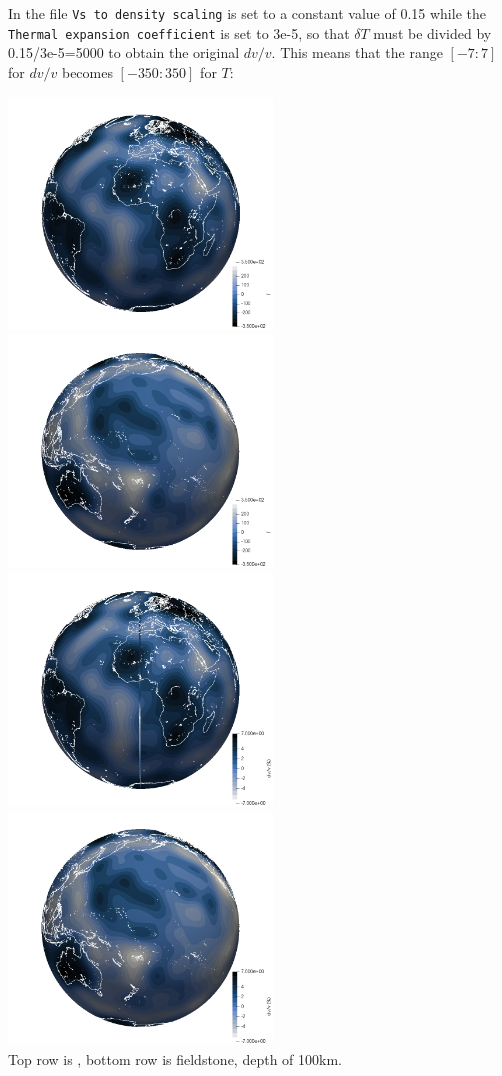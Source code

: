 In the file \texttt{Vs to density scaling} is set to a constant value of 0.15 while 
the \texttt{Thermal expansion coefficient} is set to 3e-5, so that $\delta T$ must be 
divided by 0.15/3e-5=5000 to obtain the original $dv/v$. This means that the 
range $[-7:7]$ for $dv/v$ becomes $[-350:350]$ for $T$:


\begin{center}
\includegraphics[width=7cm]{python_codes/fieldstone_85/aspect/aspect1}
\includegraphics[width=7cm]{python_codes/fieldstone_85/aspect/aspect2}\\
\includegraphics[width=7cm]{python_codes/fieldstone_85/aspect/fieldstone1}
\includegraphics[width=7cm]{python_codes/fieldstone_85/aspect/fieldstone2}\\
{\captionfont Top row is \aspect{}, bottom row is fieldstone, depth of 100km.}
\end{center}









